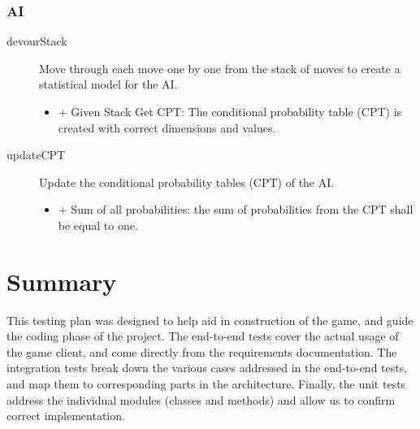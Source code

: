 \documentclass[12pt]{article}
\begin{document}
\section{AI}
\begin{description}
	\item[devourStack] Move through each move one by one from the stack of moves to create a statistical model for the AI.
	\begin{itemize}
		\item + Given Stack Get CPT: The conditional probability table (CPT) is created with correct dimensions and values. 
	\end{itemize}
	\item[updateCPT] Update the conditional probability tables (CPT) of the AI.
	\begin{itemize}
		\item + Sum of all probabilities: the sum of probabilities from the CPT shall be equal to one.
    \end{itemize}
\end{description}


\part{Summary}

This testing plan was designed to help aid in construction of the game, and guide the
coding phase of the project.  The end-to-end tests cover the actual usage of the game
client, and come directly from the requirements documentation.  The integration tests
break down the various cases addressed in the end-to-end tests, and map them to corresponding
parts in the architecture.  Finally, the unit tests address the individual modules (classes
and methods) and allow us to confirm correct implementation.
\end{document}
